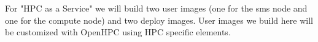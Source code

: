 For "HPC as a Service" we will build two user images (one for the sms node and one for the compute node) and two deploy images. User images we build here will be customized with OpenHPC using HPC specific elements. 
